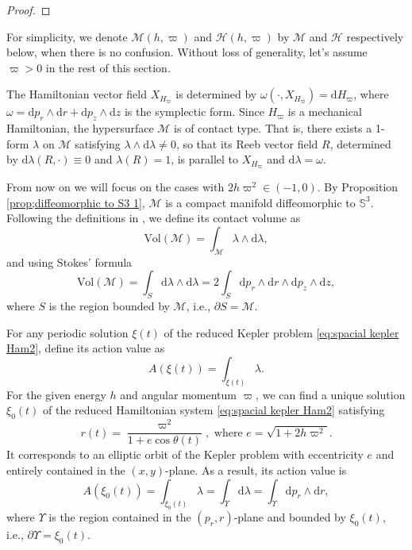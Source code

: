 \documentclass[11pt]{amsart}
\newcommand{\M}{\mathcal M}
\newcommand{\om}{\varpi}
\begin{document}
\begin{proof}
\end{proof}


For simplicity, we denote $\mathcal{M}(h,\om)$ and $\mathcal{H}(h,\om)$ by $\mathcal{M}$ and $\mathcal{H}$ respectively below, when there is no confusion. Without loss of generality, let's assume $\om>0$ in the rest of this section. 

The Hamiltonian vector field $X_{H_\om}$ is determined by $\omega(\cdot,X_{H_\om})=\mathrm{d}H_\om$, where $\omega=\mathrm{d}p_{r}\wedge\mathrm{d}r+\mathrm{d}p_{z}\wedge\mathrm{d}z$ is the symplectic form. Since $H_\om$ is a mechanical Hamiltonian, the hypersurface $\M$ is of contact type. That is, there exists a 1-form $\lambda$ on $\M$ satisfying $\lambda\wedge\mathrm{d}\lambda\neq0$, so that its Reeb vector field $R$, determined by $\mathrm{d}\lambda(R,\cdot)\equiv 0$ and $\lambda(R)=1$, is parallel to $X_{H_\om}$ and $\mathrm{d}\lambda=\omega$. 

From now on we will focus on the cases with $2h\om^2 \in (-1, 0)$. By Proposition \ref{prop;diffeomorphic to S3 1}, $\mathcal{M}$ is a compact manifold diffeomorphic to $\mathbb{S}^{3}$. Following the definitions in \cite{CHHL23}, we define its contact volume as 
\begin{equation}
\text{Vol}(\mathcal{M})=\int_{\mathcal{M}}\lambda\wedge\mathrm{d}\lambda,
\end{equation}
and using Stokes' formula 
\begin{equation} \label{eq:the expression of contact volume}
	\text{Vol}(\mathcal{M}) =\int_{S}\mathrm{d}\lambda\wedge\mathrm{d}\lambda=2\int_{S}\mathrm{d}p_{r}\wedge\mathrm{d}r\wedge\mathrm{d}p_{z}\wedge\mathrm{d}z,
\end{equation}
where $S$ is the region bounded by $\M$, i.e.,  $\partial S=\mathcal{M}$. 

For any periodic solution $\xi(t)$ of the reduced Kepler problem \eqref{eq:spacial kepler Ham2}, define its action value as 
\begin{equation} 
	A(\xi(t))=\int_{\xi(t)}\lambda.
\end{equation}
For the given energy $h$ and angular momentum $\om$, we can find a unique solution $\xi_0(t)$ of the reduced Hamiltonian system \eqref{eq:spacial kepler Ham2} satisfying 
\begin{equation} \label{eq;r-tht}
	r(t)=\frac{\om^{2}}{1+e\cos\theta(t)}, \text{ where } e=\sqrt{1+2h\om^{2}}.
\end{equation}
It corresponds to an elliptic orbit of the Kepler problem with eccentricity $e$ and entirely contained in the $(x,y)$-plane. 
As a result, its action value is
\begin{equation} \label{eq:the expression of action}
	A(\xi_0(t))=\int_{\xi_0(t)}\lambda =\int_{\Upsilon}\mathrm{d}\lambda=\int_{\Upsilon}\mathrm{d}p_{r}\wedge\mathrm{d}r,
\end{equation}
where $\Upsilon$ is the region contained in the $(p_r, r)$-plane and bounded by $\xi_0(t)$, i.e., $\partial \Upsilon=\xi_0(t)$.
 
\end{document}
